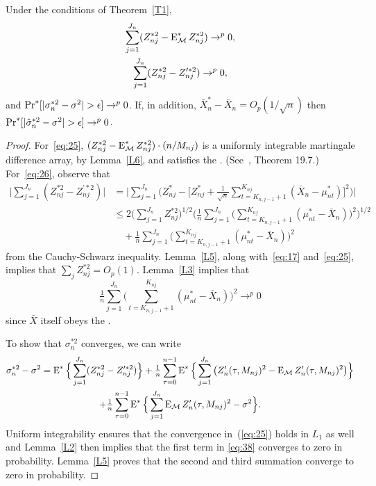 \documentclass[11pt]{article}
\begin{document}
\begin{lem}\label{L4}
Under the conditions of Theorem~\ref{T1},
\begin{gather}
  \label{eq:25}
  \sum_{j=1}^{J_n} (Z_{nj}^{*2} - \operatorname{E}_{\mathcal{M}}^* Z_{nj}^{*2}) \to^p 0,
  \\
  \label{eq:26}
  \sum_{j=1}^{J_n} (Z_{nj}^{*2} - Z_{nj}^{\prime*2}) \to^p 0,
\end{gather}
and $\operatorname{Pr}^*[ |\sigma_n^{*2} - \sigma^2| > \epsilon] \to^p 0$.
If, in addition, $\bar X_n^* - \bar X_n = O_p(1/\sqrt{n})$ then
$\operatorname{Pr}^*[ |\hat\sigma_n^{*2} - \sigma^2| > \epsilon] \to^p 0$.
\end{lem}

\begin{proof}
  For~\eqref{eq:25}, $(Z_{nj}^{*2} - \operatorname{E}_{\mathcal{M}}^* Z_{nj}^{*2}) \cdot (n /
  M_{nj})$ is a uniformly integrable martingale difference array, by
  Lemma~\ref{L6}, and
  satisfies the \lln. (See~\citealp{Dav:94}, Theorem 19.7.)
  For~\eqref{eq:26}, observe that
  \begin{align*}
    \Big| \sum_{j=1}^{J_n} (Z_{nj}^{*2} - Z_{nj}^{\prime*2}) \Big|
    &= \Big| \sum_{j=1}^{J_n} \big(Z_{nj}^{*} - \big[Z_{nj}^{*} + \tfrac{1}{\sqrt{n}} \sum_{t=K_{n,j-1}+1}^{K_{nj}} (\bar X_n - \mu_{nt}^*)\big]^2\big) \Big| \\
    &\leq 2 \Big(\sum_{j=1}^{J_n} Z_{nj}^{*2} \Big)^{1/2}
    \Big(\tfrac{1}{n} \sum_{j=1}^{J_n} \Big( \sum_{t= K_{n,j-1} + 1}^{K_{nj}}
    (\mu_{nt}^{*} - \bar X_n)\Big)^2 \Big)^{1/2}\\
    &\quad + \tfrac{1}{n} \sum_{j=1}^{J_n} \Big( \sum_{t= K_{n,j-1} + 1}^{K_{nj}}
    (\mu_{nt}^{*} - \bar X_n)\Big)^2
  \end{align*}
  from the Cauchy-Schwarz inequality. Lemma~\ref{L5}, along
  with~\eqref{eq:17} and~\eqref{eq:25}, implies that
  $\sum_j Z_{nj}^{*2} = O_p(1)$. Lemma~\ref{L3} implies that
  \[
    \tfrac{1}{n} \sum_{j=1}^{J_n} \Big( \sum_{t= K_{n,j-1} + 1}^{K_{nj}}
    (\mu_{nt}^{*} - \bar X_n)\Big)^2 \to^p 0
  \]
  since $\bar X$ itself obeys the \lln.

  To show that $\sigma_n^{*2}$ converges, we can write
  \begin{multline}\label{eq:38}
    \sigma_n^{*2} - \sigma^2 = \operatorname{E}^*\Big\{ \sum_{j=1}^{J_n} (Z_{nj}^{*2} - Z_{nj}^{\prime*2}) \Big\}
    + \tfrac{1}{n} \sum_{\tau=0}^{n-1} \operatorname{E}^* \Big\{\sum_{j=1}^{J_n}
    \big( Z_{n}^{\prime}(\tau,M_{nj})^2 - \operatorname{E}_{\mathcal{M}} Z_{n}^{\prime}(\tau,M_{nj})^2 \big)\Big\} \\
    + \tfrac{1}{n} \sum_{\tau=0}^{n-1} \operatorname{E}^* \Big\{\sum_{j=1}^{J_n}
    \operatorname{E}_{\mathcal{M}} Z_{n}^{\prime}(\tau,M_{nj})^2  - \sigma^2\Big\}.
  \end{multline}
  Uniform integrability ensures that the convergence in~(\ref{eq:25})
  holds in $L_1$ as well and Lemma~\ref{L2} then implies that
  the first term in \eqref{eq:38} converges to zero in probability.
  Lemma~\ref{L5} proves that the second and third
  summation converge to zero in probability.


\end{proof}
\end{document}
